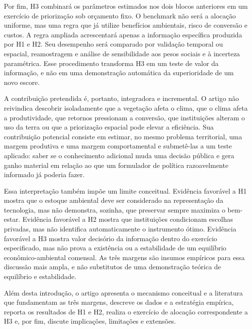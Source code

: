 Por fim, H3 combinará os parâmetros estimados nos dois blocos anteriores em um exercício de priorização sob orçamento fixo. O benchmark não será a alocação uniforme, mas uma regra que já utilize benefícios ambientais, risco de conversão e custos. A regra ampliada acrescentará apenas a informação específica produzida por H1 e H2. Seu desempenho será comparado por validação temporal ou espacial, reamostragem e análise de sensibilidade aos pesos sociais e à incerteza paramétrica. Esse procedimento transforma H3 em um teste de valor da informação, e não em uma demonstração automática da superioridade de um novo escore.

A contribuição pretendida é, portanto, integradora e incremental. O artigo não reivindica descobrir isoladamente que a vegetação afeta o clima, que o clima afeta a produtividade, que retornos pressionam a conversão, que instituições alteram o uso da terra ou que a priorização espacial pode elevar a eficiência. Sua contribuição potencial consiste em estimar, no mesmo problema territorial, uma margem produtiva e uma margem comportamental e submetê-las a um teste aplicado: saber se o conhecimento adicional muda uma decisão pública e gera ganho material em relação ao que um formulador de política razoavelmente informado já poderia fazer.

Essa interpretação também impõe um limite conceitual. Evidência favorável a H1 mostra que o estoque ambiental deve ser considerado na representação da tecnologia, mas não demonstra, sozinha, que preservar sempre maximiza o bem-estar. Evidência favorável a H2 mostra que instituições condicionam escolhas privadas, mas não identifica automaticamente o instrumento ótimo. Evidência favorável a H3 mostra valor decisório da informação dentro do exercício especificado, mas não prova a existência ou a estabilidade de um equilíbrio econômico-ambiental comensal. As três margens são insumos empíricos para essa discussão mais ampla, e não substitutos de uma demonstração teórica de equilíbrio e estabilidade.

Além desta introdução, o artigo apresenta o mecanismo conceitual e a literatura que fundamentam as três margens, descreve os dados e a estratégia empírica, reporta os resultados de H1 e H2, realiza o exercício de alocação correspondente a H3 e, por fim, discute implicações, limitações e extensões.